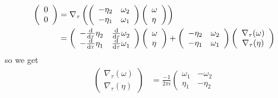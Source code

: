 \begin{frame}
    \begin{align*}
        \left(\begin{array}{l}
                0\\
                0
                \end{array}\right)\amp=\nabla_\tau\left(\left(\begin{array}{ll}
                    -\eta_{2} & \omega_{2} \\
                    -\eta_{1} & \omega_{1}
                    \end{array}\right)\left(\begin{array}{l}
                    \omega \\
                    \eta
        \end{array}\right)\right)\\\amp=
        \left(\begin{array}{cc}
                -\frac{\diff}{\diff\tau}\eta_{2}^{} & \frac{\diff}{\diff\tau}\omega_{2}^{} \\
                -\frac{\diff}{\diff\tau} \eta_{1}^{} & \frac{\diff}{\diff\tau}\omega_{1}^{}
                \end{array}\right)\left(\begin{array}{l}
                \omega \\
                \eta
                \end{array}\right)+\left(\begin{array}{ll}
                -\eta_{2} & \omega_{2} \\
                -\eta_{1} & \omega_{1}
                \end{array}\right)\left(\begin{array}{c}
                \nabla_{\tau}(\omega) \\
                \nabla_{\tau}(\eta)
        \end{array}\right)
    \end{align*}\pause
    so we get
    \begin{align*}
        \left(\begin{array}{c}
                \nabla_{\tau}(\omega) \\
                \nabla_{\tau}(\eta)
                \end{array}\right) &=\frac{-1}{2 \pi i}\left(\begin{array}{cc}
                \omega_{1} & -\omega_{2} \\
                \eta_{1} & -\eta_{2}

\end{array}
\end{align*}
\end{frame}
